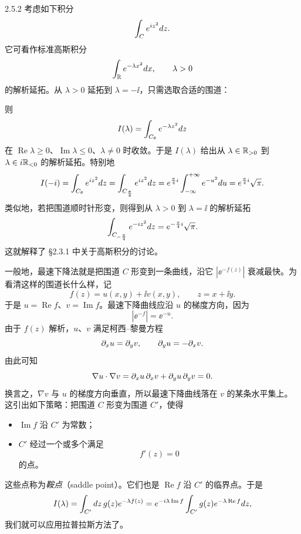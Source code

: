 \begin{example}{2.5.2}
考虑如下积分
\[
\int_Ce^{i z^2}d z.
\]
它可看作标准高斯积分
\[
\int_{\mathbb{R}}e^{-\lambda x^2}d x,\qquad \lambda>0
\]
的解析延拓。从 $\lambda>0$ 延拓到 $\lambda=-\ii$，只需选取合适的围道：

\begin{center}
\end{center}

则
\[
I(\lambda)=\int_{C_\theta}e^{-\lambda z^2}d z
\]
在 $\operatorname{Re}\lambda\ge0$、$\operatorname{Im}\lambda\le0$、$\lambda\ne0$ 时收敛。于是 $I(\lambda)$ 给出从 $\lambda\in\mathbb{R}_{>0}$ 到 $\lambda\in i\mathbb{R}_{<0}$ 的解析延拓。特别地
\[
I(-i)=\int_{C_\theta}e^{i z^2}d z
=\int_{C_{\frac\pi4}}e^{i z^2}d z
=e^{\frac\pi4i}\int_{-\infty}^{+\infty}e^{-u^2}d u
=e^{\frac\pi4i}\sqrt{\pi}.
\]
类似地，若把围道顺时针形变，则得到从 $\lambda>0$ 到 $\lambda=\ii$ 的解析延拓
\[
\int_{C_{-\frac\pi4}}e^{-i z^2}d z=e^{-\frac\pi4i}\sqrt{\pi}.
\]
这就解释了 §2.3.1 中关于高斯积分的讨论。
\end{example}

一般地，最速下降法就是把围道 $C$ 形变到一条曲线，沿它 $|\ee^{-f(z)}|$ 衰减最快。为看清这样的围道长什么样，记
\[
f(z)=u(x,y)+\ii v(x,y),\qquad z=x+\ii y.
\]
于是 $u=\operatorname{Re}f$、$v=\operatorname{Im}f$。最速下降曲线应沿 $u$ 的梯度方向，因为
\[
|\ee^{-f}|=\ee^{-u}.
\]
由于 $f(z)$ 解析，$u$、$v$ 满足柯西–黎曼方程
\[
\partial_xu=\partial_yv,\qquad \partial_yu=-\partial_xv.
\]
由此可知
\[
\nabla u\cdot\nabla v=\partial_xu\,\partial_xv+\partial_yu\,\partial_yv=0.
\]
换言之，$\nabla v$ 与 $u$ 的梯度方向垂直，所以最速下降曲线落在 $v$ 的某条水平集上。这引出如下策略：把围道 $C$ 形变为围道 $C'$，使得
\begin{itemize}
  \item[①] $\operatorname{Im}f$ 沿 $C'$ 为常数；
  \item[②] $C'$ 经过一个或多个满足
  \[
  f'(z)=0
  \]
  的点。
\end{itemize}
这些点称为\emph{鞍点}（saddle point）。它们也是 $\operatorname{Re}f$ 沿 $C'$ 的临界点。于是
\[
I(\lambda)=\int_{C'}d z\,g(z)e^{-\lambda f(z)}
=e^{-i\lambda\operatorname{Im}f}\int_{C'}g(z)e^{-\lambda\operatorname{Re}f}d z,
\]
我们就可以应用拉普拉斯方法了。

